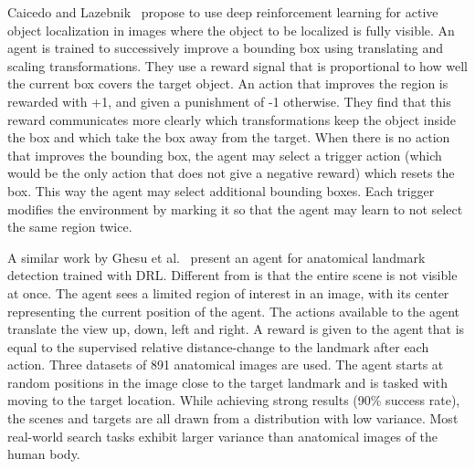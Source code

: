 Caicedo and Lazebnik~\cite{caicedo_active_2015} propose to use deep reinforcement learning for active object localization in images where the object to be localized is fully visible.
An agent is trained to successively improve a bounding box using translating and scaling transformations.
They use a reward signal that is proportional to how well the current box covers the target object.
An action that improves the region is rewarded with +1, and given a punishment of -1 otherwise.
They find that this reward communicates more clearly which transformations keep the object inside the box and which take the box away from the target.
When there is no action that improves the bounding box, the agent may select a trigger action (which would be the only action that does not give a negative reward) which resets the box.
This way the agent may select additional bounding boxes.
Each trigger modifies the environment by marking it so that the agent may learn to not select the same region twice. %




A similar work by Ghesu et al.~\cite{ghesu_artificial_2016} present an agent for anatomical landmark detection trained with DRL.
Different from \cite{caicedo_active_2015} is that the entire scene is not visible at once.
The agent sees a limited region of interest in an image, with its center representing the current position of the agent.
The actions available to the agent translate the view up, down, left and right.
A reward is given to the agent that is equal to the supervised relative distance-change to the landmark after each action.
Three datasets of 891 anatomical images are used.
The agent starts at random positions in the image close to the target landmark and is tasked with moving to the target location.
While achieving strong results (90\% success rate), the scenes and targets are all drawn from a distribution with low variance.
Most real-world search tasks exhibit larger variance than anatomical images of the human body.




